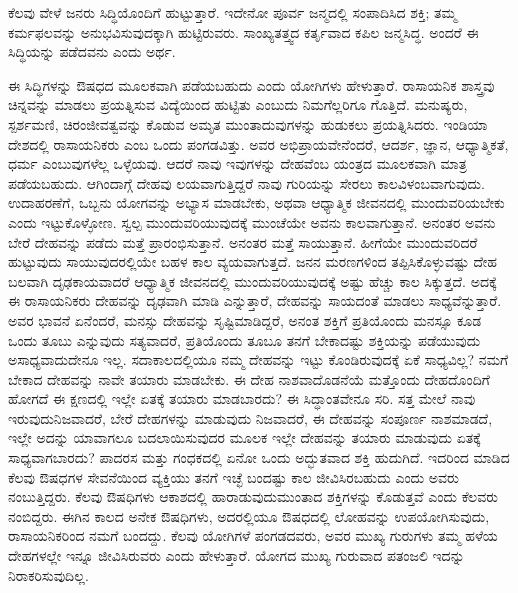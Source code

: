 \vspace{0.2cm}

ಕೆಲವು ವೇಳೆ ಜನರು ಸಿದ್ಧಿಯೊಂದಿಗೆ ಹುಟ್ಟುತ್ತಾರೆ. ಇದೇನೋ ಪೂರ್ವ ಜನ್ಮದಲ್ಲಿ ಸಂಪಾದಿಸಿದ ಶಕ್ತಿ; ತಮ್ಮ ಕರ್ಮಫಲವನ್ನು ಅನುಭವಿಸುವುದಕ್ಕಾಗಿ ಹುಟ್ಟಿರುವರು. ಸಾಂಖ್ಯತತ್ತ್ವದ ಕರ್ತೃವಾದ ಕಪಿಲ ಜನ್ಮಸಿದ್ಧ. ಅಂದರೆ ಈ ಸಿದ್ಧಿಯನ್ನು ಪಡೆದವನು ಎಂದು ಅರ್ಥ. 

\vspace{0.2cm}

ಈ ಸಿದ್ಧಿಗಳನ್ನು ಔಷಧದ ಮೂಲಕವಾಗಿ ಪಡೆಯಬಹುದು ಎಂದು ಯೋಗಿಗಳು ಹೇಳುತ್ತಾರೆ. ರಾಸಾಯನಿಕ ಶಾಸ್ತ್ರವು ಚಿನ್ನವನ್ನು ಮಾಡಲು ಪ್ರಯತ್ನಿಸುವ ವಿದ್ಯೆಯಿಂದ ಹುಟ್ಟಿತು ಎಂಬುದು ನಿಮಗೆಲ್ಲರಿಗೂ ಗೊತ್ತಿದೆ. ಮನುಷ್ಯರು, ಸ್ಪರ್ಶಮಣಿ, ಚಿರಂಜೀವತ್ವವನ್ನು ಕೊಡುವ ಅಮೃತ ಮುಂತಾದುವುಗಳನ್ನು ಹುಡುಕಲು ಪ್ರಯತ್ನಿಸಿದರು. ಇಂಡಿಯಾ ದೇಶದಲ್ಲಿ ರಾಸಾಯನಿಕರು ಎಂಬ ಒಂದು ಪಂಗಡವಿತ್ತು. ಅವರ ಅಭಿಪ್ರಾಯವೇನೆಂದರೆ, ಆದರ್ಶ, ಜ್ಞಾನ, ಆಧ್ಯಾತ್ಮಿಕತೆ, ಧರ್ಮ ಎಂಬುವುಗಳೆಲ್ಲ ಒಳ್ಳೆಯವು. ಆದರೆ ನಾವು ಇವುಗಳನ್ನು ದೇಹವೆಂಬ ಯಂತ್ರದ ಮೂಲಕವಾಗಿ ಮಾತ್ರ ಪಡೆಯಬಹುದು. ಆಗಿಂದಾಗ್ಗೆ ದೇಹವು ಲಯವಾಗುತ್ತಿದ್ದರೆ ನಾವು ಗುರಿಯನ್ನು ಸೇರಲು ಕಾಲವಿಳಂಬವಾಗುವುದು. ಉದಾಹರಣೆಗೆ, ಒಬ್ಬನು ಯೋಗವನ್ನು ಅಭ್ಯಾಸ ಮಾಡಬೇಕು, ಅಥವಾ ಆಧ್ಯಾತ್ಮಿಕ ಜೀವನದಲ್ಲಿ ಮುಂದುವರಿಯಬೇಕು ಎಂದು ಇಟ್ಟುಕೊಳ್ಳೋಣ. ಸ್ವಲ್ಪ ಮುಂದುವರಿಯುವುದಕ್ಕೆ ಮುಂಚೆಯೇ ಅವನು ಕಾಲವಾಗುತ್ತಾನೆ. ಅನಂತರ ಅವನು ಬೇರೆ ದೇಹವನ್ನು ಪಡೆದು ಮತ್ತೆ ಪ್ರಾರಂಭಿಸುತ್ತಾನೆ. ಅನಂತರ ಮತ್ತೆ ಸಾಯುತ್ತಾನೆ. ಹೀಗೆಯೇ ಮುಂದುವರಿದರೆ ಹುಟ್ಟುವುದು ಸಾಯುವುದರಲ್ಲಿಯೇ ಬಹಳ ಕಾಲ ವ್ಯಯವಾಗುತ್ತದೆ. ಜನನ ಮರಣಗಳಿಂದ ತಪ್ಪಿಸಿಕೊಳ್ಳುವಷ್ಟು ದೇಹ ಬಲವಾಗಿ ದೃಢಕಾಯವಾದರೆ ಆಧ್ಯಾತ್ಮಿಕ ಜೀವನದಲ್ಲಿ ಮುಂದುವರಿಯುವುದಕ್ಕೆ ಅಷ್ಟು ಹೆಚ್ಚು ಕಾಲ ಸಿಕ್ಕುತ್ತದೆ. ಅದಕ್ಕೆ ಈ ರಾಸಾಯನಿಕರು ದೇಹವನ್ನು ದೃಢವಾಗಿ ಮಾಡಿ ಎನ್ನುತ್ತಾರೆ, ದೇಹವನ್ನು ಸಾಯದಂತೆ ಮಾಡಲು ಸಾಧ್ಯವೆನ್ನುತ್ತಾರೆ. ಅವರ ಭಾವನೆ ಏನೆಂದರೆ, ಮನಸ್ಸು ದೇಹವನ್ನು ಸೃಷ್ಟಿಮಾಡಿದ್ದರೆ, ಅನಂತ ಶಕ್ತಿಗೆ ಪ್ರತಿಯೊಂದು ಮನಸ್ಸೂ ಕೂಡ ಒಂದು ತೂಬು ಎನ್ನುವುದು ಸತ್ಯವಾದರೆ, ಪ್ರತಿಯೊಂದು ತೂಬೂ ತನಗೆ ಬೇಕಾದಷ್ಟು ಶಕ್ತಿಯನ್ನು ಪಡೆಯುವುದು ಅಸಾಧ್ಯವಾದುದೇನೂ ಇಲ್ಲ. ಸದಾಕಾಲದಲ್ಲಿಯೂ ನಮ್ಮ ದೇಹವನ್ನು ಇಟ್ಟು ಕೊಂಡಿರುವುದಕ್ಕೆ ಏಕೆ ಸಾಧ್ಯವಿಲ್ಲ? ನಮಗೆ ಬೇಕಾದ ದೇಹವನ್ನು ನಾವೇ ತಯಾರು ಮಾಡಬೇಕು. ಈ ದೇಹ ನಾಶವಾದೊಡನೆಯೆ ಮತ್ತೊಂದು ದೇಹದೊಂದಿಗೆ ಹೋಗದೆ ಈ ಕ್ಷಣದಲ್ಲಿ ಇಲ್ಲೇ ಏತಕ್ಕೆ ತಯಾರು ಮಾಡಬಾರದು? ಈ ಸಿದ್ಧಾಂತವೇನೂ ಸರಿ. ಸತ್ತ ಮೇಲೆ ನಾವು ಇರುವುದು\break ನಿಜವಾದರೆ, ಬೇರೆ ದೇಹಗಳನ್ನು ಮಾಡುವುದು ನಿಜವಾದರೆ, ಈ ದೇಹವನ್ನು ಸಂಪೂರ್ಣ ನಾಶಮಾಡದೆ, ಇಲ್ಲೇ ಅದನ್ನು ಯಾವಾಗಲೂ ಬದಲಾಯಿಸುವುದರ ಮೂಲಕ ಇಲ್ಲೇ ದೇಹವನ್ನು ತಯಾರು ಮಾಡುವುದು ಏತಕ್ಕೆ ಸಾಧ್ಯವಾಗಬಾರದು? ಪಾದರಸ ಮತ್ತು ಗಂಧಕದಲ್ಲಿ ಏನೋ ಒಂದು ಅದ್ಭುತವಾದ ಶಕ್ತಿ ಹುದುಗಿದೆ. ಇದರಿಂದ ಮಾಡಿದ ಕೆಲವು ಔಷಧಗಳ ಸೇವನೆಯಿಂದ ವ್ಯಕ್ತಿಯು ತನಗೆ ಇಚ್ಛೆ ಬಂದಷ್ಟು ಕಾಲ ಜೀವಿಸಿರಬಹುದು ಎಂದು ಅವರು ನಂಬುತ್ತಿದ್ದರು. ಕೆಲವು ಔಷಧಿಗಳು ಆಕಾಶದಲ್ಲಿ ಹಾರಾಡುವುದು\break ಮುಂತಾದ ಶಕ್ತಿಗಳನ್ನು ಕೊಡುತ್ತವೆ ಎಂದು ಕೆಲವರು ನಂಬಿದ್ದರು. ಈಗಿನ ಕಾಲದ ಅನೇಕ ಔಷಧಿಗಳು, ಅದರಲ್ಲಿಯೂ ಔಷಧದಲ್ಲಿ ಲೋಹವನ್ನು ಉಪಯೋಗಿಸುವುದು, ರಾಸಾಯನಿಕರಿಂದ ನಮಗೆ ಬಂದದ್ದು. ಕೆಲವು ಯೋಗಿಗಳೆ ಪಂಗಡದವರು, ಅವರ ಮುಖ್ಯ ಗುರುಗಳು ತಮ್ಮ ಹಳೆಯ ದೇಹಗಳಲ್ಲೇ ಇನ್ನೂ ಜೀವಿಸಿರುವರು ಎಂದು ಹೇಳುತ್ತಾರೆ. ಯೋಗದ ಮುಖ್ಯ ಗುರುವಾದ ಪತಂಜಲಿ ಇದನ್ನು ನಿರಾಕರಿಸುವುದಿಲ್ಲ. 


